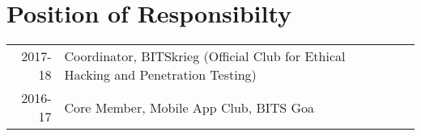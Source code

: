 \documentclass[]{deedy-resume-openfont}
\begin{document}
\begin{minipage}[t]{0.66\textwidth}

\section{Position of Responsibilty}

\begin{tabular}{rll}
2017-18  & Coordinator, BITSkrieg (Official Club for Ethical Hacking and Penetration Testing)\\
2016-17  & Core Member, Mobile App Club, BITS Goa\\
\end{tabular}
\sectionsep

\end{minipage} 
\end{document}
